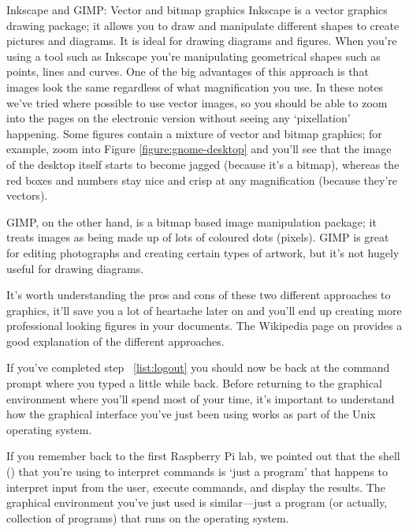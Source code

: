 \begin{diversion}{Inkscape and GIMP: Vector and bitmap graphics}
Inkscape is a vector graphics drawing package; it allows you to draw and manipulate different shapes to create pictures and diagrams. It is ideal for drawing diagrams and figures. When you're using a tool such as Inkscape you're manipulating geometrical shapes such as points, lines and curves. One of the big advantages of this approach is that images look the same regardless of what magnification you use. In these notes we've tried where possible to use vector images, so you should be able to zoom into the pages on the electronic version without seeing any `pixellation' happening. Some figures contain a mixture of vector and bitmap graphics; for example, zoom into Figure \ref{figure:gnome-desktop} and you'll see that the image of the desktop itself starts to become jagged (because it's a bitmap), whereas the red boxes and numbers stay nice and crisp at any magnification (because they're vectors).

GIMP, on the other hand, is a bitmap based image manipulation package; it treats images as being made up of lots of coloured dots (pixels). GIMP is great for editing photographs and creating certain types of artwork, but it's not hugely useful for drawing diagrams.

It's worth understanding the pros and cons of these two different approaches to graphics, it'll save you a lot of heartache later on and you'll end up creating more professional looking figures in your documents. The Wikipedia page on  provides a good explanation of the different approaches.

\end{diversion}


If you've completed step ~\ref{list:logout} you should now be back at the command prompt where you typed  a little while back. Before returning to the graphical environment where you'll spend most of your time, it's important to understand how the graphical interface you've just been using works as part of the Unix operating system.

If you remember back to the first Raspberry Pi lab, we pointed out that the shell () that you're using to interpret commands is `just a program' that happens to interpret input from the user, execute commands, and display the results. The graphical environment you've just used is similar---just a program (or actually, collection of programs) that runs on the operating system.

